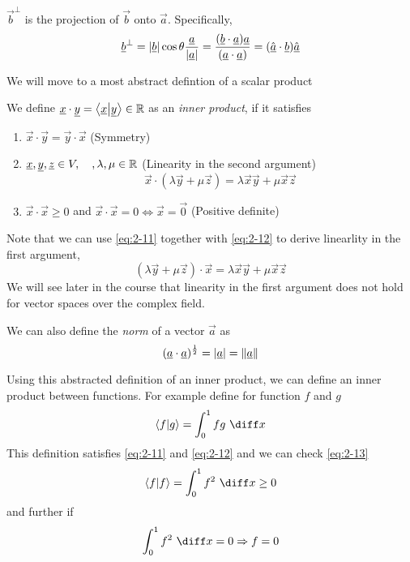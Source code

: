 \documentclass{article}
\numberwithin{equation}{section}
\begin{document}
\begin{defi}[Projection]
    $\vec{b}^\perp$ is the projection of $\vec{b}$ onto $\vec{a}$. Specifically, 
    \begin{equation}
        \underline{b}^\perp = \left\lvert \underline{b}\right\rvert\cos{\theta}\frac{\underline{a}}{\left\lvert \underline{a}\right\rvert} = \frac{(\underline{b}\cdot\underline{a})\underline{a}}{(\underline{a}\cdot\underline{a})} = (\hat{\underline{a}} \cdot \underline{b})\hat{\underline{a}} 
    \end{equation}
\end{defi}

We will move to a most abstract defintion of a scalar product
\begin{defi}
    We define $\underline{x} \cdot \underline{y} = \left\langle \underline{x}\middle\vert \underline{y} \right\rangle \in \mathbb{R}$ as an \emph{inner product}, if it satisfies
    \begin{enumerate}[eqn]
        \item $\vec{x} \cdot \vec{y} = \vec{y} \cdot \vec{x}$ \hspace*{\fill}(Symmetry) \label{eq:2-11}
        \item $\underline{x}, \underline{y}, \underline{z} \in V, \quad, \lambda, \mu \in \mathbb{R}$ \hspace*{\fill}(Linearity in the second argument) \label{eq:2-12}
        \[
            \vec{x} \cdot (\lambda\vec{y} + \mu\vec{z}) = \lambda\vec{x}\vec{y} + \mu\vec{x}\vec{z}  
        \]
        \item $\vec{x} \cdot \vec{x} \geq 0 $ and $\vec{x} \cdot \vec{x} = 0 \Leftrightarrow \vec{x} = \vec{0}$ \hspace*{\fill}(Positive definite) \label{eq:2-13}
    \end{enumerate}

    Note that we can use \eqref{eq:2-11} together with \eqref{eq:2-12} to derive linearlity in the first argument,
    \begin{equation}
        (\lambda\vec{y} + \mu\vec{z}) \cdot \vec{x} = \lambda\vec{x}\vec{y} + \mu\vec{x}\vec{z} \label{eq:2-15}
    \end{equation}
    We will see later in the course that linearity in the first argument does not hold for vector spaces over the complex field.

    We can also define the \emph{norm} of a vector $\vec{a}$ as 
    \[
        (\underline{a} \cdot \underline{a})^\frac{1}{2} = \left\lvert \underline{a}\right\rvert = \left\lVert \underline{a}\right\rVert  
    \]
\end{defi}

\begin{remark}
    Using this abstracted definition of an inner product, we can define an inner product between functions. For example define for function $f$ and $g$
    \[
        \braket{f}{g} = \int_{0}^{1}{fg \ \diff x}
    \]
    This definition satisfies \eqref{eq:2-11} and \eqref{eq:2-12} and we can check \eqref{eq:2-13}
    \[
        \braket{f}{f} = \int_{0}^{1}{f^2 \ \diff x} \geq 0
    \]
    and further if 
    \[
        \int_{0}^{1}{f^2 \ \diff x} = 0 \Rightarrow f = 0
    \]
\end{remark}
\end{document}
